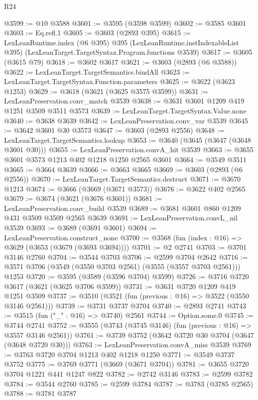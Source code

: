 \begin{lexlean}{R24}
\begin{coremodule}
@3599 := @10 @3588
@3601 := @3595 (@3598 @3599)
@3602 := @3585 @3601
@3603 := Eq.refl.{1}
@3605 := @3603 (@2893 @395)
@3615 := LexLeanRuntime.index
    (@6 @395)
    @395
    (LexLeanRuntime.instIndexableList @395)
    (LexLeanTarget.TargetSyntax.Program.functions @3539)
@3617 := @3605 (@3615 @79)
@3618 := @3602 @3617
@3621 := @3603 (@2893 (@6 @3588))
@3622 := LexLeanTarget.TargetSemantics.bindAll
@3623 := LexLeanTarget.TargetSyntax.Function.parameters
@3625 := @3622 (@3623 @1253)
@3629 := @3618 (@3621 (@3625 @3575 @3599))
@3631 := LexLeanPreservation.conv_match @3539
@3638 := @3631 @3601 @1209 @419 @1251 @3509 @3511 @3573
@3639 := LexLeanTarget.TargetSyntax.Value.none
@3640 := @3638 @3639
@3642 := LexLeanPreservation.conv_var @3539
@3645 := @3642 @3601 @30 @3573
@3647 := @3603 (@2893 @2556)
@3648 := LexLeanTarget.TargetSemantics.lookup
@3653 := @3640 (@3645 (@3647 (@3648 @3601 @30)))
@3655 := LexLeanPreservation.convA_hit @3539
@3663 := @3655 @3601 @3573 @1213 @402 @1218 @1250 @2565 @3601
@3664 := @3549 @3511
@3665 := @3664 @3639
@3666 := @3663 @3665
@3669 := @3603 (@2893 (@6 @2556))
@3670 := LexLeanTarget.TargetSemantics.destruct
@3671 := @3670 @1213
@3674 := @3666 (@3669 (@3671 @3573))
@3676 := @3622 @402 @2565
@3679 := @3674 (@3621 (@3676 @3601))
@3681 := LexLeanPreservation.conv_build @3539
@3689 := @3681 @3601 @860 @1209 @431 @3509 @3509 @2565 @3639
@3691 := LexLeanPreservation.convL_nil @3539
@3693 := @3689 (@3691 @3601)
@3694 := LexLeanPreservation.construct_none
@3700 := @3568 (fun (index : @16) => @3629 (@3653 (@3679 (@3693 @3694))))
@3701 := @2 @2741
@3703 := @3701 @3146 @2760
@3704 := @3544 @3703
@3706 := @2599 @3704 @2642
@3716 := @3571 @3706 (@3549 (@3550 @3703 @2561) (@3555 (@3557 @3703 @2561))) @1253
@3720 := @3595 (@3589 (@3596 @3704) @3599)
@3726 := @3716 @3720 @3617 (@3621 (@3625 @3706 @3599))
@3731 := @3631 @3720 @1209 @419 @1251 @3509
@3737 := @3510 (@3521 (fun (previous : @16) => @3522 (@3550 @3146 @2561)))
@3739 := @3731 @3737 @3704
@3740 := @2893 @2741
@3743 := @3515 (fun ("_" : @16) => @3740) @2561
@3744 := Option.some.{0}
@3745 := @3744 @2741
@3752 := @3555 (@3743 (@3745 @3146) (fun (previous : @16) => @3557 @3146 @2561))
@3761 := @3739 @3752 (@3642 @3720 @30 @3704 (@3647 (@3648 @3720 @30)))
@3763 := LexLeanPreservation.convA_miss @3539
@3769 := @3763 @3720 @3704 @1213 @402 @1218 @1250
@3771 := @3549 @3737 @3752
@3775 := @3769 @3771 (@3669 (@3671 @3704))
@3781 := @3655 @3720 @3704 @1221 @441 @1247 @822
@3782 := @2742 @3146
@3783 := @2599 @3782
@3784 := @3544 @2760
@3785 := @2599 @3784
@3787 := @3783 (@3785 @2565)
@3788 := @3781 @3787

\end{coremodule}
\end{lexlean}
